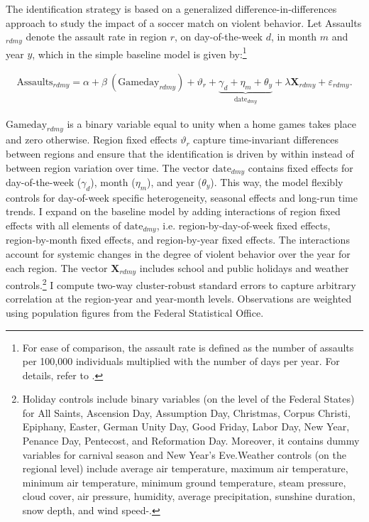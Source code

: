 \documentclass[11pt, a4paper]{article} %
\begin{document}
The identification strategy is based on a generalized difference-in-differences approach to study the impact of a soccer match on violent behavior. Let Assaults$_{rdmy}$ denote the assault rate in region $r$, on day-of-the-week $d$, in month $m$ and year $y$, which in the simple baseline model is given by:\footnote{For ease of comparison, the assault rate is defined as the number of assaults per 100,000 individuals multiplied with the number of days per year. For details, refer to \cite{hener2019noise}.}

\begin{align}
	\text{Assaults}_{rdmy} = \alpha + \beta\ (\text{Gameday}_{rdmy}) + \vartheta_r + \underbrace{\gamma_d + \eta_m + \theta_y}_{\text{date}_{dmy}} + \lambda \mathbf{X}_{rdmy} + \varepsilon_{rdmy}
	\label{eq_soc_ext:model}.
\end{align}

$\text{Gameday}_{rdmy}$ is a binary variable equal to unity when a home games takes place and zero otherwise. Region fixed effects $\vartheta_r$ capture time-invariant differences between regions and ensure that the identification is driven by within instead of between region variation over time. The vector $\text{date}_{dmy}$ contains fixed effects for day-of-the-week ($\gamma_d$), month ($\eta_m$), and year ($\theta_y$). This way, the model flexibly controls for day-of-week specific heterogeneity, seasonal effects and long-run time trends. I expand on the baseline model by adding interactions of region fixed effects with all elements of $\text{date}_{dmy}$, i.e. region-by-day-of-week fixed effects, region-by-month fixed effects, and region-by-year fixed effects. The interactions account for systemic changes in the degree of violent behavior over the year for each region. The vector $\mathbf{X}_{rdmy}$ includes school and public holidays and weather controls.\footnote{Holiday controls include binary variables (on the level of the Federal States) for All Saints, Ascension Day, Assumption Day, Christmas, Corpus Christi, Epiphany, Easter, German Unity Day, Good Friday, Labor Day, New Year, Penance Day, Pentecost, and Reformation Day. Moreover, it contains dummy variables for carnival season and New Year's Eve.\newline Weather controls (on the regional level) include average air temperature, maximum air temperature, minimum air temperature, minimum ground temperature, steam pressure, cloud cover, air pressure, humidity, average precipitation, sunshine duration, snow depth, and wind speed-.} I compute two-way cluster-robust standard errors to capture arbitrary correlation at the region-year and year-month levels. Observations are weighted using population figures from the Federal Statistical Office.
\end{document}
